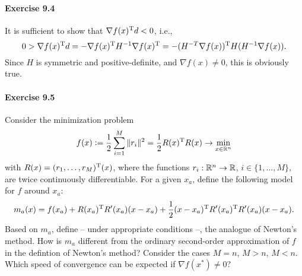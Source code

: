 \paragraph{Exercise 9.4}
It is sufficient to show that $\nabla f(x)^{\text{\upshape T}} d < 0$, i.e.,
\[
0
> \nabla f(x)^{\text{\upshape T}} d
= - \nabla f(x)^{\text{\upshape T}} H^{-1} \nabla f(x)^{\text{\upshape T}}
= - (H^{-T} \nabla f(x))^{\text{\upshape T}} H (H^{-1} \nabla f(x)).
\]
Since $H$ is symmetric and positive-definite, and $\nabla f(x)\neq 0$, this is obviously true.


\paragraph{Exercise 9.5}
Consider the minimization problem
\[
  f(x)\mathrel{\mathop:}= \frac{1}{2}\sum_{i=1}^M\|r_i\|^2 = \frac{1}{2}R(x)^{\text{\upshape T}} R(x) \to \min_{x\in\mathbb{R}^n}
\]
with $R(x)=(r_1,\dots,r_M)^{\text{\upshape T}}(x)$, where the functions $r_i:\mathbb{R}^n\to\mathbb{R}$, $i\in\{1,\dots,M\}$, are twice continuously differentiable. For a given $x_a$, define the following model for $f$ around $x_a$:
\[
  m_a(x) = f(x_a)
         + R(x_a)^{\text{\upshape T}} R'(x_a)(x-x_a)
         + \frac{1}{2} (x-x_a)^{\text{\upshape T}} R'(x_a)^{\text{\upshape T}} R'(x_a)(x-x_a).
\]
Based on $m_a$, define -- under appropriate conditions --, the analogue of
Newton's method. How is $m_a$ different from the ordinary second-order
approximation of $f$ in the defintion of Newton's method? Consider the cases
$M=n$, $M>n$, $M<n$. Which speed of convergence can be expected if $\nabla
f(x^*)\neq 0$?


